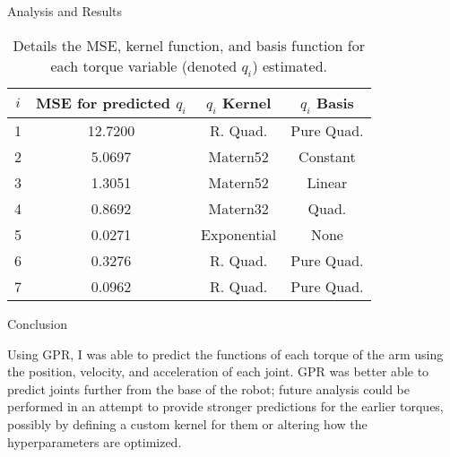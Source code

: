 \documentclass[final]{beamer}
\newlength{\onecolwid}
\begin{document}
\begin{frame}[t]
\begin{columns}[t]
\begin{column}{\onecolwid}
\begin{block}{Analysis and Results}
    \begin{table}
        \caption{Details the MSE, kernel function, and basis function for
        each torque variable (denoted $q_{i}$) estimated.}
        \vspace*{1mm}
        \begin{tabular}{cccc}
            \midrule
            \midrule
            $i$ & MSE for predicted $q_{i}$ & $q_{i}$ Kernel & $q_{i}$ Basis  \\
            \midrule
            1   & 12.7200                   & R. Quad.    & Pure Quad.        \\
            2   &  5.0697                   & Matern52    & Constant          \\
            3   &  1.3051                   & Matern52    & Linear            \\
            4   &  0.8692                   & Matern32    & Quad.             \\
            5   &  0.0271                   & Exponential & None              \\
            6   &  0.3276                   & R. Quad.    & Pure Quad.        \\
            7   &  0.0962                   & R. Quad.    & Pure Quad.        \\
            \midrule
            \midrule
        \end{tabular}
        \label{table:table1}
    \end{table}\vspace{-1.25cm}

\end{block}

\begin{block}{Conclusion}

    Using GPR, I was able to predict the functions of each torque
    of the arm using the position, velocity, and acceleration of each joint. GPR was better able
    to predict joints further from the base of the robot; future analysis
    could be performed in an attempt to provide stronger predictions for the
    earlier torques, possibly by defining a custom kernel for them or altering how the
    hyperparameters are optimized.

\end{block}


\end{column} %

\end{columns} %

\end{frame} %
\end{document}
